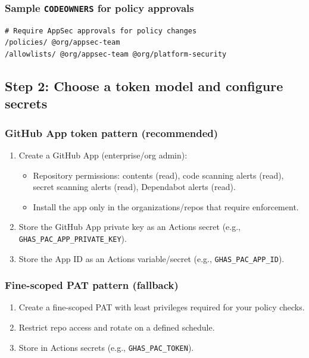 \documentclass[11pt]{article}
\renewcommand{\cmd}[1]{\texttt{#1}}
\begin{document}
\subsubsection{Sample \cmd{CODEOWNERS} for policy approvals}

\begin{lstlisting}[style=ghascode]
# Require AppSec approvals for policy changes
/policies/ @org/appsec-team
/allowlists/ @org/appsec-team @org/platform-security
\end{lstlisting}

\subsection{Step 2: Choose a token model and configure secrets}

\subsubsection{GitHub App token pattern (recommended)}

\begin{enumerate}[leftmargin=*]
  \item Create a GitHub App (enterprise/org admin):
    \begin{itemize}
      \item Repository permissions: contents (read), code scanning alerts (read), secret scanning alerts (read), Dependabot alerts (read).
      \item Install the app only in the organizations/repos that require enforcement.
    \end{itemize}
  \item Store the GitHub App private key as an Actions secret (e.g., \cmd{GHAS\_PAC\_APP\_PRIVATE\_KEY}).
  \item Store the App ID as an Actions variable/secret (e.g., \cmd{GHAS\_PAC\_APP\_ID}).
\end{enumerate}

\subsubsection{Fine-scoped PAT pattern (fallback)}

\begin{enumerate}[leftmargin=*]
  \item Create a fine-scoped PAT with least privileges required for your policy checks.
  \item Restrict repo access and rotate on a defined schedule.
  \item Store in Actions secrets (e.g., \cmd{GHAS\_PAC\_TOKEN}).
\end{enumerate}
\end{document}
